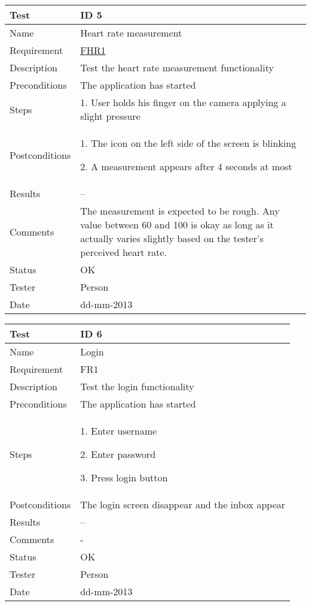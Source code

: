 \begin{table}
\begin{center}
\begin{tabular}{ | l | p{10cm} | }
	\hline
	\textbf{Test}	&	\textbf{ID 5} \\
	\hline\noalign{\smallskip}\noalign{\smallskip}\hline
	Name				& Heart rate measurement \\
	Requirement			& \hyperref[table:reqheartrate]{FHR1} \\
	Description			& Test the heart rate measurement functionality \\
	Preconditions		& The application has started \\
	Steps 				&	\par 1. User holds his finger on the camera applying a slight pressure \\
	Postconditions		&	\par 1. The icon on the left side of the screen is blinking 
							\par 2. A measurement appears after 4 seconds at most \\
	Results				& -- \\
	Comments			&	The measurement is expected to be rough.
							Any value between 60 and 100 is okay as long as it actually varies slightly based
							on the tester's perceived heart rate.  \\
	Status				& OK \\
	Tester				& Person \\
	Date				& dd-mm-2013 \\
	\hline
\end{tabular}
\end{center}
\end{table}


\begin{table}
\begin{center}
\begin{tabular}{ | l | p{10cm} | }
	\hline
	\textbf{Test}	&	\textbf{ID 6} \\
	\hline\noalign{\smallskip}\noalign{\smallskip}\hline
	Name				& Login \\
	Requirement			& FR1 \\
	Description			& Test the login functionality \\
	Preconditions		& The application has started \\
	Steps 				&	\par 1. Enter username
							\par 2. Enter password
							\par 3. Press login button \\
	Postconditions		& The login screen disappear and the inbox appear \\
	Results				& -- \\
	Comments			& - \\
	Status				& OK \\
	Tester				& Person \\
	Date				& dd-mm-2013 \\
	\hline
\end{tabular}
\end{center}
\end{table}


